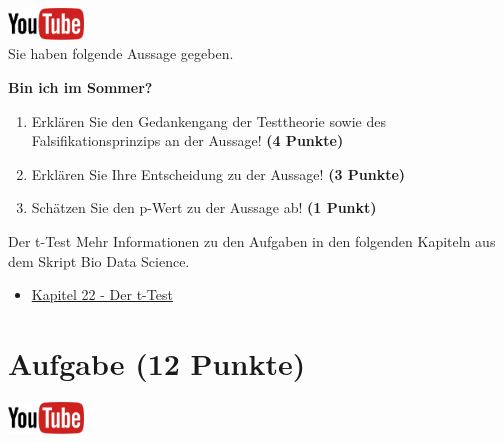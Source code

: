 \documentclass[a4paper, 10pt]{scrartcl}\usepackage[]{graphicx}\usepackage[]{xcolor}
\begin{document}
\hfill\href{https://youtu.be/gQwvMuZ-Sjs}{\includegraphics[width =
  2cm]{img/youtube}}\\[1Ex]



Sie haben folgende Aussage gegeben.

\begin{center}
  \Large\textbf{Bin ich im Sommer?}
\end{center}

\begin{enumerate}
\item Erkl{\"a}ren Sie den Gedankengang der Testtheorie sowie des Falsifikationsprinzips an der Aussage! \textbf{(4 Punkte)}
\item Erkl{\"a}ren Sie Ihre Entscheidung zu der Aussage! \textbf{(3 Punkte)}
\item Sch{\"a}tzen Sie den p-Wert zu der Aussage ab! \textbf{(1 Punkt)}
\end{enumerate}

 
\clearpage
\begin{graybox}{Der t-Test}
Mehr Informationen zu den Aufgaben in den folgenden Kapiteln aus dem Skript Bio Data Science.
  \begin{itemize}
  \item \href{https://jkruppa.github.io/stat-tests-ttest.html}{Kapitel 22 - Der t-Test}
  \end{itemize}
\end{graybox}
\clearpage

\section{Aufgabe \hfill (12 Punkte)}

\hfill\href{https://youtu.be/Cq_rF_z4xOk}{\includegraphics[width =
  2cm]{img/youtube}}\\[1Ex]
\end{document}
